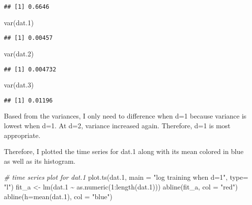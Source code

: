 \documentclass[
]{article}
\newenvironment{Shaded}{\begin{snugshade}}{\end{snugshade}}
\newcommand{\AttributeTok}[1]{\textcolor[rgb]{0.77,0.63,0.00}{#1}}
\newcommand{\CommentTok}[1]{\textcolor[rgb]{0.56,0.35,0.01}{\textit{#1}}}
\newcommand{\DecValTok}[1]{\textcolor[rgb]{0.00,0.00,0.81}{#1}}
\newcommand{\FloatTok}[1]{\textcolor[rgb]{0.00,0.00,0.81}{#1}}
\newcommand{\FunctionTok}[1]{\textcolor[rgb]{0.00,0.00,0.00}{#1}}
\newcommand{\NormalTok}[1]{#1}
\newcommand{\OtherTok}[1]{\textcolor[rgb]{0.56,0.35,0.01}{#1}}
\newcommand{\SpecialCharTok}[1]{\textcolor[rgb]{0.00,0.00,0.00}{#1}}
\newcommand{\StringTok}[1]{\textcolor[rgb]{0.31,0.60,0.02}{#1}}
\begin{document}
\begin{verbatim}
## [1] 0.6646
\end{verbatim}

\begin{Shaded}
\begin{Highlighting}[]
\FunctionTok{var}\NormalTok{(dat}\FloatTok{.1}\NormalTok{)}
\end{Highlighting}
\end{Shaded}

\begin{verbatim}
## [1] 0.00457
\end{verbatim}

\begin{Shaded}
\begin{Highlighting}[]
\FunctionTok{var}\NormalTok{(dat}\FloatTok{.2}\NormalTok{)}
\end{Highlighting}
\end{Shaded}

\begin{verbatim}
## [1] 0.004732
\end{verbatim}

\begin{Shaded}
\begin{Highlighting}[]
\FunctionTok{var}\NormalTok{(dat}\FloatTok{.3}\NormalTok{)}
\end{Highlighting}
\end{Shaded}

\begin{verbatim}
## [1] 0.01196
\end{verbatim}

Based from the variances, I only need to difference when d=1 because
variance is lowest when d=1. At d=2, variance increased again.
Therefore, d=1 is most appropriate.

Therefore, I plotted the time series for dat.1 along with its mean
colored in blue as well as its histogram.

\begin{Shaded}
\begin{Highlighting}[]
\CommentTok{\# time series plot for dat.1}
\FunctionTok{plot.ts}\NormalTok{(dat}\FloatTok{.1}\NormalTok{, }\AttributeTok{main =} \StringTok{"log training when d=1"}\NormalTok{, }\AttributeTok{type=} \StringTok{"l"}\NormalTok{)}
\NormalTok{fit\_a }\OtherTok{\textless{}{-}} \FunctionTok{lm}\NormalTok{(dat}\FloatTok{.1} \SpecialCharTok{\textasciitilde{}} \FunctionTok{as.numeric}\NormalTok{(}\DecValTok{1}\SpecialCharTok{:}\FunctionTok{length}\NormalTok{(dat}\FloatTok{.1}\NormalTok{)))}
\FunctionTok{abline}\NormalTok{(fit\_a, }\AttributeTok{col =} \StringTok{"red"}\NormalTok{)}
\FunctionTok{abline}\NormalTok{(}\AttributeTok{h=}\FunctionTok{mean}\NormalTok{(dat}\FloatTok{.1}\NormalTok{), }\AttributeTok{col =} \StringTok{"blue"}\NormalTok{)}
\end{Highlighting}
\end{Shaded}
\end{document}
